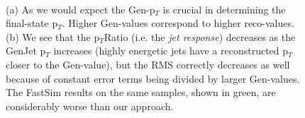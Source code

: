 \begin{figure}
    \myfloatalign
    \\
    \caption[Conditioning]{ (a) As we would expect the Gen-p$_T$ is crucial in determining the final-state p$_T$. Higher Gen-values correspond to higher reco-values. (b) We see that the p$_T$Ratio (i.e. the \emph{jet response}) decreases as the GenJet p$_T$ increases (highly energetic jets have a reconstructed p$_T$ closer to the Gen-value), but the RMS correctly decreases as well because of constant error terms being divided by larger Gen-values. The FastSim results on the same samples, shown in green, are considerably worse than our approach.}\label{fig:condit}
    
\end{figure}

